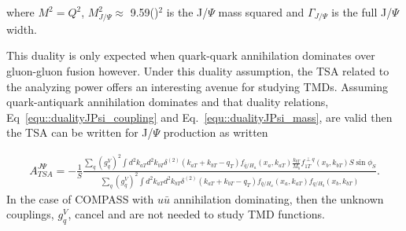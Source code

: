 \noindent
where $M^2 = Q^2$, $M_{J/\Psi}^2 \approx$ 9.59\;({\gvcw})$^2$ is the J/$\Psi$
mass squared and $\Gamma_{J/\Psi}$ is the full J/$\Psi$ width.

This duality is only expected when quark-quark annihilation dominates over
gluon-gluon fusion however.  Under this duality assumption, the TSA related to
the analyzing power offers an interesting avenue for studying TMDs.  Assuming
quark-antiquark annihilation dominates and that duality relations,
Eq~\ref{equ::dualityJPsi_coupling} and Eq.~\ref{equ::dualityJPsi_mass}, are
valid then the TSA can be written for J/$\Psi$ production as
written~\cite{Anselmino:2016fhz}

\begin{align}
  \label{equ::AN_TSA_JPsi}
 A^{J\Psi}_{TSA} = -\frac{1}{S}
  \frac{\sum_q (g_q^V)^2 \int d^2k_{aT} d^2k_{bT}
    \delta^{(2)}(k_{aT}+k_{bT}-q_T)f_{\bar{q}/H_a}(x_a, k_{aT})
    \frac{k_{bT}}{M_b}f_{1T}^{\perp q}(x_b, k_{bT})
    S\sin \phi_S}
  {\sum_q (g_q^V)^2 \int d^2k_{aT} d^2k_{bT}
    \delta^{(2)}(k_{aT}+k_{bT}-q_T)
    f_{\bar{q}/H_a}(x_a, k_{aT})f_{q/H_b}(x_b, k_{bT})}.
\end{align}
\noindent
In the case of COMPASS with $u\bar{u}$ annihilation dominating, then the unknown
couplings, $g_q^V$, cancel and are not needed to study TMD functions.
